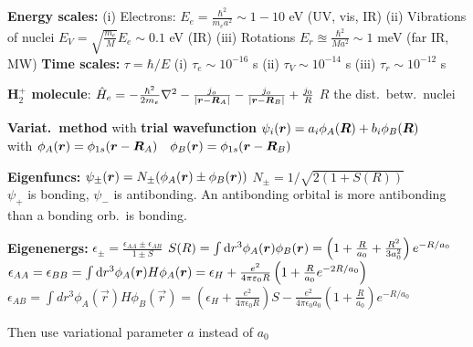 \squishline

\textbf{Energy scales:} (i) Electrons: $E_e = \frac{\hbar^2}{m_e a^2}\sim 1-10$ eV (UV, vis, IR)
(ii) Vibrations of nuclei $E_V = \sqrt{\frac{m_e}{M}}E_e \sim 0.1$ eV (IR) (iii) Rotations $E_r \approxeq \frac{\hbar^2}{Ma^2} \sim 1$ meV (far IR, MW)
\textbf{Time scales:} $\tau = \hbar/E$ (i) $\tau_e \sim 10^{-16}$ s (ii) $\tau_V \sim 10^{-14}$ s (iii) $\tau_r \sim 10^{-12}$ s

\squishline

\textbf{H$_2^+$ molecule}: $\hat{H}_e = - \frac{\hbar^2}{2m_e} \nabla^2 - \frac{j_o}{|\bm{r} - \bm{R}_A|} - \frac{j_o}{|\bm{r} - \bm{R}_B|} + \frac{j_0}{R}$ \quad $R$ the dist.\ betw.\ nuclei 
\begin{squishlist}
    \item \textbf{Variat.\ method} with \textbf{trial wavefunction} $\psi_i(\bm{r}) = a_i \phi_A(\bm{R}) + b_i \phi_B(\bm{R})$ \\ with $\phi_A(\bm{r})=\phi_{1s}(\bm{r} - \bm{R}_A) \quad \phi_B(\bm{r})=\phi_{1s}(\bm{r} - \bm{R}_B)$ 
    \item \textbf{Eigenfuncs:} $\psi_{\pm}(\bm{r}) = N_{\pm} (\phi_A(\bm{r})\pm \phi_B(\bm{r}))$ \quad $N_{\pm} = 1/\sqrt{2(1+S(R))} $
     \\
    $\psi_+$ is bonding, $\psi_-$ is antibonding. An antibonding orbital is more antibonding than a bonding orb.\ is bonding.
    \item \textbf{Eigenenergs:} $\epsilon_{\pm} = \frac{\epsilon_{AA} \pm \epsilon_{AB}}{1\pm S}$ \quad  $S(R) = \int \textrm{d} r^3 \phi_A(\bm{r}) \phi_B(\bm{r}) = \left(1 + \frac{R}{a_0} + \frac{R^2}{3a_0^2}\right) e^{-R/a_0}$\\
    $\epsilon_{AA} = \epsilon_{BB} = \int \textrm{d} r^3 \phi_{A}(\bm{r}) H \phi_{A}(\bm{r}) = \epsilon_H + \frac{e^2}{4\pi\varepsilon_0 R}\left(1 + \frac{R}{a_0}e^{-2R/a_0}\right)$ \\
    $\epsilon_{AB} = \int dr^3 \phi_A(\vec{r}) H \phi_B(\vec{r}) = \left(\epsilon_H +  \frac{e^2}{4 \pi \epsilon_0R}\right) S - \frac{e^2}{4 \pi \epsilon_0a_0} \left( 1 + \frac{R}{a_0} \right) e^{-R/a_0}$
    \item Then use variational parameter $a$ instead of $a_0$
\end{squishlist}

\squishline

